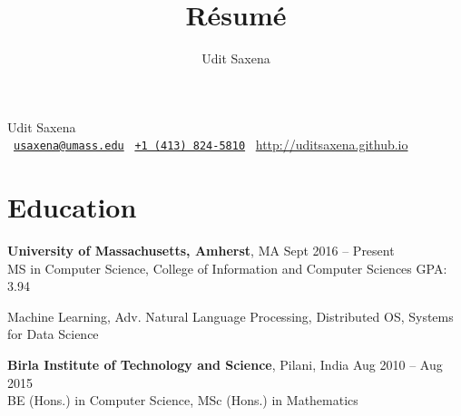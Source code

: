 \documentclass[letterpaper]{article}
\title{R\'esum\'e}
\author{Udit Saxena}
\begin{document}
\pagecolor{white}
\begin{center}
\huge
Udit Saxena\\
\small
\faEnvelope~\href{mailto:usaxena@umass.edu}{\nolinkurl{usaxena@umass.edu}}
\faPhone~\href{tel:14138245810}{\texttt{+1 (413) 824-5810}}
\faGlobe~\url{http://uditsaxena.github.io}
\normalsize
\end{center}

\section*{Education}
\vspace{-1mm}
\textbf{University of Massachusetts, Amherst}, MA \hfill Sept 2016 --
    Present\\
MS in Computer Science, College of Information and Computer Sciences \hfill GPA: 3.94
\vspace{-2mm}
\begin{description}[leftmargin=!, labelwidth=\widthof{Coursework },
        font=\normalfont]
    \item[Coursework:] Machine Learning, Adv. Natural Language Processing, Distributed OS,
                        Systems for Data Science
\end{description}
\vspace{-0.5mm}
\textbf{Birla Institute of Technology and Science}, Pilani, India \hfill
    Aug 2010 -- Aug 2015\\
BE (Hons.) in Computer Science,
MSc (Hons.) in Mathematics
\vspace{-1mm}
\end{document}
